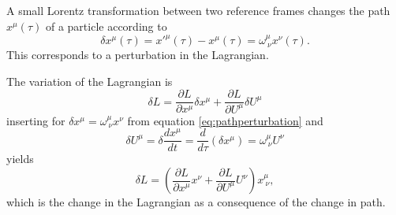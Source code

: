 \documentclass[11pt]{amsart}
\begin{document}
\subsection{}
A small Lorentz transformation between two reference frames changes the path $x^\mu(\tau)$ of a particle according to
\begin{equation}
\label{eq:pathperturbation}
\delta x^\mu(\tau) = x'^\mu(\tau) - x^\mu(\tau) = \omega^\mu_{\ \nu}x^\nu(\tau).
\end{equation}
This corresponds to a perturbation in the Lagrangian.

The variation of the Lagrangian is
\begin{equation*}
\delta L = \frac{\partial L}{\partial x^\mu} \delta x^\mu + \frac{\partial L}{\partial U^\mu} \delta U^\mu
\end{equation*}
inserting for $\delta x^\mu = \omega^\mu_{\ \nu} x^\nu$ from equation \ref{eq:pathperturbation} and 
\begin{equation*}
\delta U^\mu = \delta \frac{d x^\mu}{d t} = \frac{d}{d\tau}(\delta x^\mu) = \omega^\mu_{\ \nu}U^\nu 
\end{equation*} 
yields
\begin{equation}
\label{eq:lagrangeperturbartion}
\delta L = \left(\frac{\partial L}{\partial x^\mu}x^\nu + \frac{\partial L}{\partial U^\mu}U^\nu \right)x^\mu_{\ \nu},
\end{equation}
which is the change in the Lagrangian as a consequence of the change in path.
\end{document}
